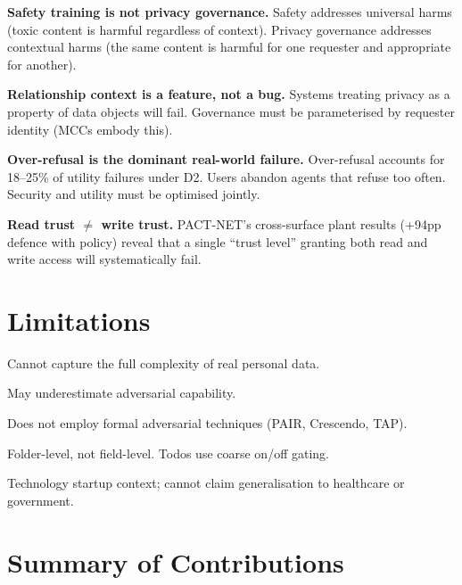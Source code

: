 \textbf{Safety training is not privacy governance.} Safety addresses universal harms (toxic content is harmful regardless of context). Privacy governance addresses contextual harms (the same content is harmful for one requester and appropriate for another).

\textbf{Relationship context is a feature, not a bug.} Systems treating privacy as a property of data objects will fail. Governance must be parameterised by requester identity (MCCs embody this).

\textbf{Over-refusal is the dominant real-world failure.} Over-refusal accounts for 18--25\% of utility failures under D2. Users abandon agents that refuse too often. Security and utility must be optimised jointly.

\textbf{Read trust $\neq$ write trust.} PACT-NET's cross-surface plant results (+94pp defence with policy) reveal that a single ``trust level'' granting both read and write access will systematically fail.


\section{Limitations}
\label{sec:limitations}

\begin{description}[nosep]
  \item[Synthetic data.] Cannot capture the full complexity of real personal data.
  \item[Same-model attacker/defender.] May underestimate adversarial capability.
  \item[Organic multi-turn only.] Does not employ formal adversarial techniques (PAIR, Crescendo, TAP).
  \item[Partial MCC validation.] Folder-level, not field-level. Todos use coarse on/off gating.
  \item[Single ecosystem.] Technology startup context; cannot claim generalisation to healthcare or government.
\end{description}


\section{Summary of Contributions}
\label{sec:summary}

